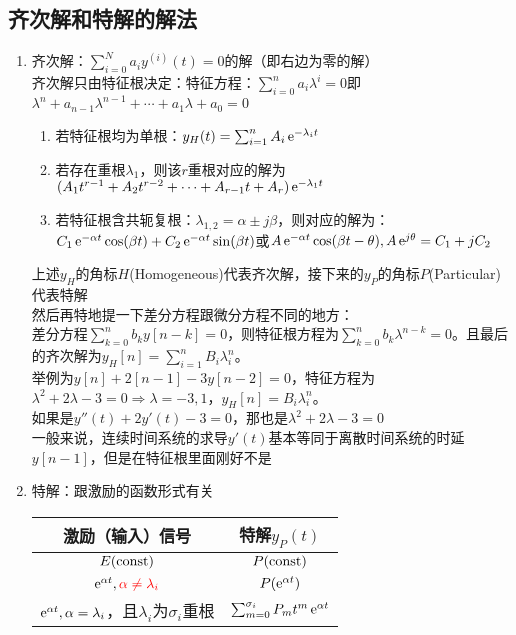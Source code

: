 \documentclass{article}
\begin{document}
\subsection{齐次解和特解的解法}
\begin{enumerate}[label=(\arabic*)]
	\item 齐次解：$\sum_{i=0}^{N}a_iy^{(i)}(t) = 0$的解（即右边为零的解）\\
			齐次解只由特征根决定：特征方程：$\sum_{i=0}^{n}a_i\lambda^i = 0$即$\lambda^n+a_{n-1}\lambda^{n-1}+\cdots +a_1\lambda+a_0 = 0$
			\begin{enumerate}[label=(\alph*)]
				\item 若特征根均为单根：$y_{H}(t) = \sum_{i=1}^{n}A_i \operatorname{e}^{-\lambda_i t}$
				\item 若存在重根$\lambda_1$，则该$r$重根对应的解为$(A_1t^{r-1}+A_2t^{r-2}+\cdots +A_{r-1}t+A_r)\operatorname{e}^{-\lambda_1 t}$
				\item 若特征根含共轭复根：$\lambda_{1,2} = \alpha \pm j\beta$，则对应的解为：$C_1\operatorname{e}^{-\alpha t}\cos(\beta t)+C_2\operatorname{e}^{-\alpha t}\sin(\beta t)$或$A\operatorname{e}^{-\alpha t}\cos(\beta t-\theta),A\operatorname{e}^{j\theta}=C_1+jC_2$
			\end{enumerate}
			上述$y_{H}$的角标$H$(Homogeneous)代表齐次解，接下来的$y_{P}$的角标$P$(Particular)代表特解\\
			然后再特地提一下差分方程跟微分方程不同的地方：\\
			差分方程$\sum_{k=0}^{n}b_{k}y[n-k] = 0$，则特征根方程为$\sum_{k=0}^{n}b_{k}\lambda^{n-k} = 0$。且最后的齐次解为$y_{H}[n] = \sum_{i=1}^{n}B_i\lambda_i^{n}$。\\
			举例为$y[n]+2[n-1]-3y[n-2] = 0$，特征方程为$\lambda^2+2\lambda-3 = 0\Rightarrow \lambda=-3,1$，$y_{H}[n] = B_i\lambda_i^{n}$。\\
			如果是$y''(t)+2y'(t)-3 = 0$，那也是$\lambda^2+2\lambda-3 = 0$\\
			一般来说，连续时间系统的求导$y'(t)$基本等同于离散时间系统的时延$y[n-1]$，但是在特征根里面刚好不是
	\item 特解：跟激励的函数形式有关
				\begin{table}[H]
					\centering
					\renewcommand\arraystretch{1.5}
					\begin{tabular}{c|c}
						\toprule
						激励（输入）信号 & 特解$y_{P}(t)$ \\
						\midrule
						$E(\mathrm{const})$ & $P(\mathrm{const})$ \\
						$\operatorname{e}^{\alpha t},\color{red} \alpha\neq\lambda_{i}$ & $P(\operatorname{e}^{\alpha t})$ \\
						$\operatorname{e}^{\alpha t},\alpha=\lambda_{i}$，且$\lambda_i$为$\sigma_i$重根 & $\sum_{m=0}^{\sigma_i}P_{m}t^{m}\operatorname{e}^{\alpha t}$ \\

\end{tabular}
\end{table}
\end{enumerate}
\end{document}
